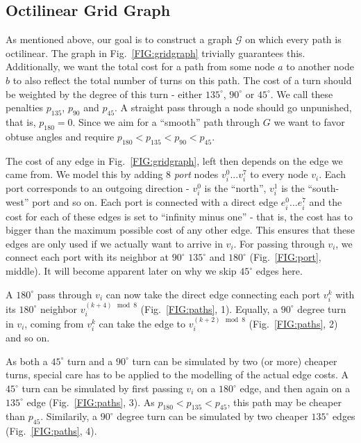 \documentclass{sig-alternate-sigmod09}
\begin{document}
\subsection{Octilinear Grid Graph}

As mentioned above, our goal is to construct a graph $\mathcal{G}$ on which every path is octilinear. The graph in Fig.~\ref{FIG:gridgraph} trivially guarantees this. Additionally, we want the total cost for a path from some node $a$ to another node $b$ to also reflect the total number of turns on this path. The cost of a turn should be weighted by the degree of this turn - either $135^{\circ}$, $90^{\circ}$ or $45^{\circ}$. We call these penalties $p_{135}$, $p_{90}$ and $p_{45}$. A straight pass through a node should go unpunished, that is, $p_{180} = 0$. Since we aim for a ``smooth'' path through $G$ we want to favor obtuse angles and require $p_{180} < p_{135} < p_{90} < p_{45}$.

The cost of any edge in Fig.~\ref{FIG:gridgraph}, left then depends on the edge we came from. We model this by adding 8 \emph{port} nodes $v_i^0 ... v_i^7$ to every node $v_i$. Each port corresponds to an outgoing direction - $v_i^0$ is the ``north'', $v_i^1$ is the ``south-west'' port and so on. Each port is connected with a direct edge $e_i^0 ... e_i^7$ and the cost for each of these edges is set to ``infinity minus one'' - that is, the cost has to bigger than the maximum possible cost of any other edge. This ensures that these edges are only used if we actually want to arrive in $v_i$. For passing through $v_i$, we connect each port with its neighbor at $90^{\circ}$ $135^{\circ}$ and $180^{\circ}$ (Fig.~\ref{FIG:port}, middle). It will become apparent later on why we skip $45^{\circ}$ edges here.

A $180^{\circ}$ pass through $v_i$ can now take the direct edge connecting each port $v_i^k$ with its $180^{\circ}$ neighbor $v_i^{(k + 4) \mod 8}$ (Fig.~\ref{FIG:paths}, 1). Equally, a $90^{\circ}$ degree turn in $v_i$, coming from $v_i^k$ can take the edge to $v_i^{(k + 2) \mod 8}$ (Fig.~\ref{FIG:paths}, 2) and so on.

As both a $45^{\circ}$ turn and a $90^{\circ}$ turn can be simulated by two (or more) cheaper turns, special care has to be applied to the modelling of the actual edge costs. A $45^{\circ}$ turn can be simulated by first passing $v_i$ on a $180^{\circ}$ edge, and then again on a $135^{\circ}$ edge (Fig.~\ref{FIG:paths}, 3). As $p_{180} < p_{135} < p_{45}$, this path may be cheaper than $p_{45}$. Similarily, a $90^{\circ}$ degree turn can be simulated by two cheaper $135^{\circ}$ edges (Fig.~\ref{FIG:paths}, 4).
\end{document}
